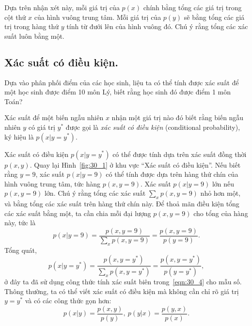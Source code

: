Dựa trên nhận xét này, mỗi giá trị của $p(x)$ chính bằng tổng các giá trị trong
cột thứ $x$ của hình vuông trung tâm. Mỗi giá trị của $p(y)$ sẽ bằng tổng các
giá trị trong hàng thứ $y$ tính từ đưới lên của hình vuông đó. Chú ý rằng tổng
các xác suất luôn bằng một.


\subsection{Xác suất có điều kiện.}

{Dựa vào phân phối điểm của các học sinh, liệu ta có thể tính được xác suất để
một học sinh được điểm 10 môn Lý, biết rằng học sinh đó được điểm 1 môn Toán?}

Xác suất để một biến ngẫu nhiên $x$ nhận một giá trị nào đó biết
rằng biến ngẫu nhiên $y$ có giá trị $y^*$ được gọi là \textit{xác suất có điều
kiện} (conditional probability), ký hiệu là $p(x| y = y^*)$.


Xác suất có điều kiện $p(x | y = y^*)$ có thể được tính dựa trên xác suất đồng
thời $p(x, y)$. Quay lại Hình~\ref{fig:30_1} ở khu vực ``Xác suất có điều
kiện''. Nếu biết rằng $y = 9$, xác suất $p(x | y = 9)$ có thể tính được dựa trên
hàng thứ chín của hình vuông trung tâm, tức hàng $p(x, y = 9)$. Xác suất $p(x | y =
9) $ lớn nếu $p(x, y= 9)$ lớn. Chú ý rằng tổng các xác suất $\sum_{x} p(x,
y = 9)$ nhỏ hơn một, và bằng tổng các xác suất trên hàng thứ chín này. Để thoả
mãn điều kiện tổng các xác suất bằng một, ta cần chia mỗi đại lượng $p(x, y =
9)$ cho tổng của hàng này, tức là
\begin{equation}
p(x | y = 9) =\frac{p(x, y = 9)}{\sum \limits_x p(x, y = 9)} =
\frac{p(x, y = 9)}{p(y = 9)}.
\end{equation}
Tổng quát,
\begin{equation}
\label{eqn:30_9}
\displaystyle
p(x|y = y^*) = \frac{p(x, y = y^*)}{\sum \limits_{x} p(x, y = y^*)} =
\frac{p(x, y = y^*)}{p(y = y^*)},
\end{equation}
ở đây ta đã sử dụng công thức tính xác suất biên trong~\eqref{eqn:30_4} cho mẫu
số. Thông thường, ta có thể viết xác suất có điều kiện mà không cần chỉ rõ giá trị $y = y^*$ và có các công thức gọn hơn:
\begin{equation}
\label{eqn:30_2}
p(x |y) = \frac{p(x, y)}{p(y)}, ~p(y | x) = \frac{p(y, x)}{p(x)}.
\end{equation}

